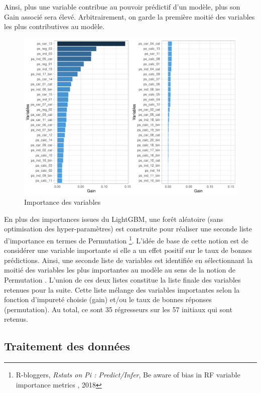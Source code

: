 \documentclass[french]{article}
\begin{document}
\begin{multicols}{2}
Ainsi, plus une variable contribue au pouvoir prédictif d'un modèle, plus son \og Gain \fg{} associé sera élevé. Arbitrairement, on garde la première moitié des variables les plus contributives au modèle.

\begin{figure}[H] \centering
  \includegraphics[width = \columnwidth]{img/var_imp_lgb}
  \caption{Importance des variables}
\end{figure}

En plus des importances issues du LightGBM, une forêt aléatoire (sans optimisation des hyper-paramètres) est construite pour réaliser une seconde liste d'importance en termes de \og Permutation \fg{} \footnote{\cite{rb1} R-bloggers, \emph{Rstats on Pi : Predict/Infer}, \og Be aware of bias in RF variable importance metrics \fg, 2018}. L'idée de base de cette notion est de considérer une variable importante si elle a un effet positif sur le taux de bonnes prédictions. Ainsi, une seconde liste de variables est identifiée en sélectionnant la moitié des variables les plus importantes au modèle au sens de la notion de \og Permutation \fg. L'union de ces deux listes constitue la liste finale des variables retenues pour la suite. Cette liste mélange des variables importantes selon la fonction d'impureté choisie (gain) et/ou le taux de bonnes réponses (permutation). Au total, ce sont 35 régresseurs sur les 57 initiaux qui sont retenus.

\subsection{Traitement des données}


\end{multicols}
\end{document}
